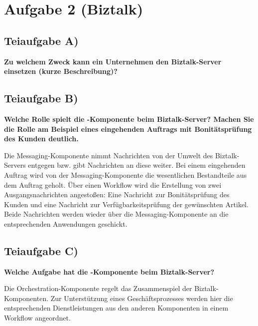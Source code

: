 \section{Aufgabe 2 (Biztalk)}

\subsection{Teiaufgabe A)}
\textbf{Zu welchem Zweck kann ein Unternehmen den Biztalk-Server einsetzen (kurze
Beschreibung)?}

\subsection{Teiaufgabe B)}
\textbf{Welche Rolle spielt die -Komponente beim Biztalk-Server?
Machen Sie die Rolle am Beispiel eines eingehenden Auftrags mit Bonitätsprüfung des Kunden
deutlich.}

Die Messaging-Komponente nimmt Nachrichten von der Umwelt des Biztalk-Servers
entgegen bzw. gibt Nachrichten an diese weiter. Bei einem eingehenden Auftrag wird
von der Messaging-Komponente die wesentlichen Bestandteile aus dem Auftrag
geholt. Über einen Workflow wird die Erstellung von zwei Ausgangsnachrichten
angestoßen: Eine Nachricht zur Bonitätsprüfung des Kunden und eine Nachricht zur
Verfügbarkeitsprüfung der gewünschten Artikel. Beide Nachrichten werden wieder
über die Messaging-Komponente an die entsprechenden Anwendungen geschickt.

\subsection{Teiaufgabe C)}
\textbf{Welche Aufgabe hat die -Komponente beim
Biztalk-Server?}

Die Orchestration-Komponente regelt das Zusammenspiel der Biztalk-Komponenten.
Zur Unterstützung eines Geschäftsprozesses werden hier die entsprechenden
Dienstleistungen aus den anderen Komponenten in einem Workflow angeordnet.

\clearpage 